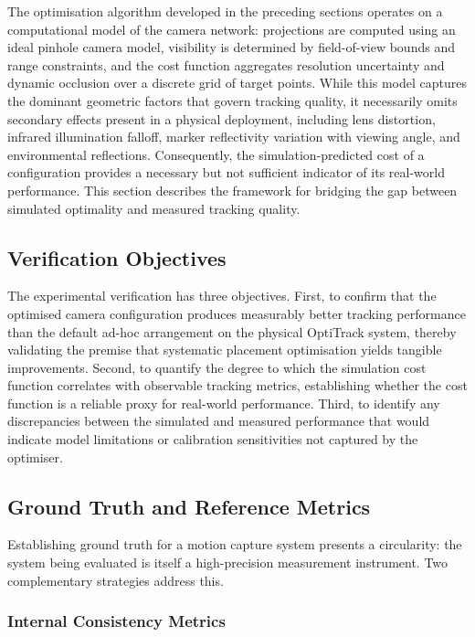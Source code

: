 The optimisation algorithm developed in the preceding sections operates on a computational model of the camera network: projections are computed using an ideal pinhole camera model, visibility is determined by field-of-view bounds and range constraints, and the cost function aggregates resolution uncertainty and dynamic occlusion over a discrete grid of target points. While this model captures the dominant geometric factors that govern tracking quality, it necessarily omits secondary effects present in a physical deployment, including lens distortion, infrared illumination falloff, marker reflectivity variation with viewing angle, and environmental reflections. Consequently, the simulation-predicted cost of a configuration provides a necessary but not sufficient indicator of its real-world performance. This section describes the framework for bridging the gap between simulated optimality and measured tracking quality.

\subsection{Verification Objectives}

The experimental verification has three objectives. First, to confirm that the optimised camera configuration produces measurably better tracking performance than the default ad-hoc arrangement on the physical OptiTrack system, thereby validating the premise that systematic placement optimisation yields tangible improvements. Second, to quantify the degree to which the simulation cost function correlates with observable tracking metrics, establishing whether the cost function is a reliable proxy for real-world performance. Third, to identify any discrepancies between the simulated and measured performance that would indicate model limitations or calibration sensitivities not captured by the optimiser.

\subsection{Ground Truth and Reference Metrics}

Establishing ground truth for a motion capture system presents a circularity: the system being evaluated is itself a high-precision measurement instrument. Two complementary strategies address this.

\subsubsection{Internal Consistency Metrics}

